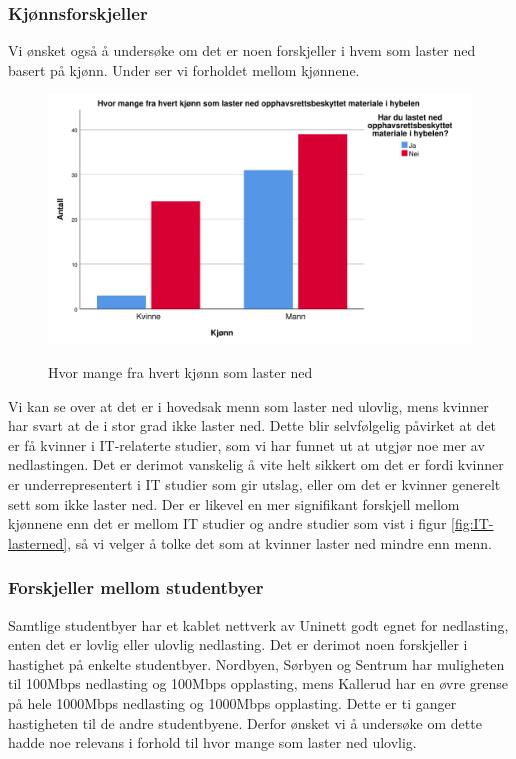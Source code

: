 \subsubsection{Kjønnsforskjeller}
Vi ønsket også å undersøke om det er noen forskjeller i hvem som laster ned basert på kjønn. Under ser vi forholdet mellom kjønnene.
\begin{figure}[H]
    \centering
    \includegraphics[scale=0.45]{case_1/bilder/kjonn_lasterned.pdf}
    \label{fig:kjønn_lasterned}
    \caption[Kjønn laster ned]{Hvor mange fra hvert kjønn som laster ned}
\end{figure}
Vi kan se over at det er i hovedsak menn som laster ned ulovlig, mens kvinner har svart at de i stor grad ikke laster ned. Dette blir selvfølgelig påvirket at det er få kvinner i IT-relaterte studier, som vi har funnet ut at utgjør noe mer av nedlastingen. Det er derimot vanskelig å vite helt sikkert om det er fordi kvinner er underrepresentert i IT studier som gir utslag, eller om det er kvinner generelt sett som ikke laster ned. Der er likevel en mer signifikant forskjell mellom kjønnene enn det er mellom IT studier og andre studier som vist i figur \ref{fig:IT-lasterned}, så vi velger å tolke det som at kvinner laster ned mindre enn menn.

\subsubsection{Forskjeller mellom studentbyer}
Samtlige studentbyer har et kablet nettverk av Uninett godt egnet for nedlasting, enten det er lovlig eller ulovlig nedlasting. Det er derimot noen forskjeller i hastighet på enkelte studentbyer. Nordbyen, Sørbyen og Sentrum har muligheten til 100Mbps nedlasting og 100Mbps opplasting, mens Kallerud har en øvre grense på hele 1000Mbps nedlasting og 1000Mbps opplasting. Dette er ti ganger hastigheten til de andre studentbyene. Derfor ønsket vi å undersøke om dette hadde noe relevans i forhold til hvor mange som laster ned ulovlig. 

